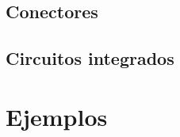 \documentclass[10pt, openany]{book}
\begin{document}




\chapter{Conectores}

\chapter{Circuitos integrados}






% 
% 

\part{Ejemplos}



\printglossaries

\printbibliography
\end{document}
